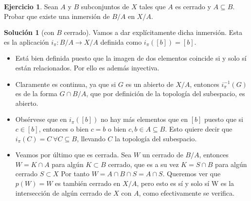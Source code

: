 \documentclass{article}
\theoremstyle{plain}
\theoremstyle{definition}
\newtheorem{exercise}{Ejercicio}
\newtheorem*{sol*}{Solución}
\begin{document}
\newpage
\begin{exercise}
Sean $A$ y $B$ subconjuntos de $X$ tales que $A$ es cerrado y $A \subseteq B$. Probar que existe una inmersión de $B/A$ en $X/A$.
\end{exercise}
\begin{sol*}[con $B$ cerrado]
Vamos a dar explícitamente dicha inmersión. Esta es la aplicación $i_\pi:B/A\rightarrow X/A$ definida como $i_\pi([b])=[b]$. 
\begin{itemize}
\item Está bien definida puesto que la imagen de dos elementos coincide si y solo sí están relacionados. Por ello es además inyectiva. 
\item Claramente es continua, ya que si $G$ es un abierto de $X/A$, entonces $i_\pi^{-1}(G)$ es de la forma $G\cap B/A$, que por definición de la topología del subespacio, es abierto. 
\item Obsérvese que en $i_\pi([b])$ no hay más elementos que en $[b]$ puesto que si $c\in[b]$, entonces o bien $c=b$ o bien $c,b\in A\subseteq B$. Esto quiere decir que $i_\pi(C)=C\ \forall C\subseteq B$, llevando $C$ la topología del subespacio. 
\item Veamos por último que es cerrada. Sea $W$ un cerrado de $B/A$, entonces $W = K \cap A$ para algún $K \subset B$ cerrado, que es a su vez $K = S \cap B$ para algún cerrado $S\subset X$ Por tanto $W=A \cap B \cap S = A \cap S$. Queremos ver que $p(W)=W$ es también cerrado en $X/A$, pero esto es sí y solo sí W es la intersección de algún cerrado de $X$ con $A$, como efectivamente se verifica.
\end{itemize} 
\end{sol*}
\end{document}

